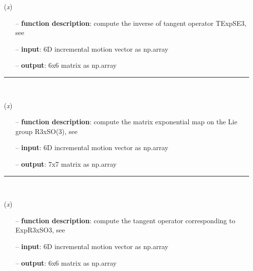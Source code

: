 \begin{itemize}[leftmargin=1.4cm]
\begin{itemize}[leftmargin=0.5cm]
\begin{itemize}[leftmargin=1.4cm]
\begin{itemize}[leftmargin=0.5cm]
\begin{itemize}[leftmargin=1.4cm]
\begin{itemize}[leftmargin=0.5cm]
\begin{itemize}[leftmargin=1.4cm]
\begin{itemize}[leftmargin=1.4cm]
\begin{itemize}[leftmargin=1.4cm]
\begin{itemize}[leftmargin=1.4cm]
\begin{itemize}[leftmargin=0.5cm]
\begin{flushleft}
\label{sec:lieGroupBasics:TExpSE3Inv}
({\it x})
\end{flushleft}
\setlength{\itemindent}{0.7cm}
\begin{itemize}[leftmargin=0.7cm]
  \item[--]  {\bf function description}: compute the inverse of tangent operator TExpSE3, see \cite{Sonneville2014}  \item[--]  {\bf input}: 6D incremental motion vector as np.array  \item[--]  {\bf output}: 6x6 matrix as np.array\vspace{12pt}\end{itemize}
%
\noindent\rule{8cm}{0.75pt}\vspace{1pt} \\ 
\begin{flushleft}
\label{sec:lieGroupBasics:ExpR3xSO3}
({\it x})
\end{flushleft}
\setlength{\itemindent}{0.7cm}
\begin{itemize}[leftmargin=0.7cm]
  \item[--]  {\bf function description}: compute the matrix exponential map on the Lie group R3xSO(3), see \cite{Bruels2011}  \item[--]  {\bf input}: 6D incremental motion vector as np.array  \item[--]  {\bf output}: 7x7 matrix as np.array\vspace{12pt}\end{itemize}
%
\noindent\rule{8cm}{0.75pt}\vspace{1pt} \\ 
\begin{flushleft}
\label{sec:lieGroupBasics:TExpR3xSO3}
({\it x})
\end{flushleft}
\setlength{\itemindent}{0.7cm}
\begin{itemize}[leftmargin=0.7cm]
  \item[--]  {\bf function description}: compute the tangent operator corresponding to ExpR3xSO3, see \cite{Bruels2011}  \item[--]  {\bf input}: 6D incremental motion vector as np.array  \item[--]  {\bf output}: 6x6 matrix as np.array\vspace{12pt}\end{itemize}

\end{itemize}
\end{itemize}
\end{itemize}
\end{itemize}
\end{itemize}
\end{itemize}
\end{itemize}
\end{itemize}
\end{itemize}
\end{itemize}
\end{itemize}
